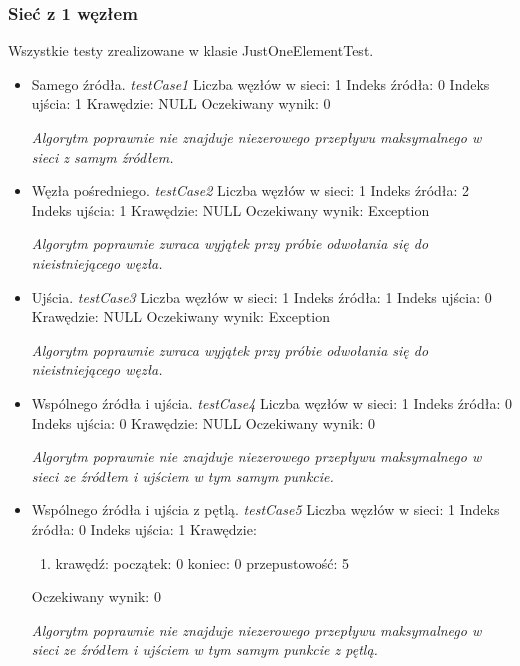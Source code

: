\subsubsection{Sieć z 1 węzłem}
Wszystkie testy zrealizowane w klasie JustOneElementTest.
\begin{itemize}[nosep]
    \item Samego źródła.
    \emph{testCase1}
    Liczba węzłów w sieci: 1
    Indeks źródła: 0
    Indeks ujścia: 1
    Krawędzie: NULL
    Oczekiwany wynik: 0

    \emph{Algorytm poprawnie nie znajduje niezerowego przepływu maksymalnego w sieci
    z samym źródłem.}

    \item Węzła pośredniego.
    \emph{testCase2}
    Liczba węzłów w sieci: 1
    Indeks źródła: 2
    Indeks ujścia: 1
    Krawędzie: NULL
    Oczekiwany wynik: Exception

    \emph{Algorytm poprawnie zwraca wyjątek przy próbie odwołania się
    do nieistniejącego węzła.}

    \item Ujścia.
    \emph{testCase3}
    Liczba węzłów w sieci: 1
    Indeks źródła: 1
    Indeks ujścia: 0
    Krawędzie: NULL
    Oczekiwany wynik: Exception

    \emph{Algorytm poprawnie zwraca wyjątek przy próbie odwołania się
    do nieistniejącego węzła.}

    \item Wspólnego źródła i ujścia.
    \emph{testCase4}
    Liczba węzłów w sieci: 1
    Indeks źródła: 0
    Indeks ujścia: 0
    Krawędzie: NULL
    Oczekiwany wynik: 0

    \emph{Algorytm poprawnie nie znajduje niezerowego
    przepływu maksymalnego w sieci ze źródłem i ujściem w tym samym punkcie.}

    \item Wspólnego źródła i ujścia z pętlą.
    \emph{testCase5}
    Liczba węzłów w sieci: 1
    Indeks źródła: 0
    Indeks ujścia: 1
    Krawędzie:
    \begin{enumerate}[nosep]
        \item krawędź:
        początek: 0
        koniec: 0
        przepustowość: 5
    \end{enumerate}
    Oczekiwany wynik: 0

    \emph{Algorytm poprawnie nie znajduje niezerowego
    przepływu maksymalnego w sieci ze źródłem i ujściem w tym samym punkcie z pętlą.}
\end{itemize}


